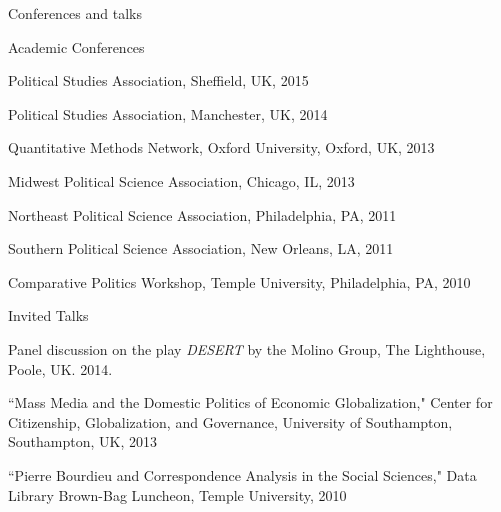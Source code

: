 \documentclass{resume} %
\begin{document}

\begin{rSection}{Conferences and talks}

\begin{rSubsection}{Academic Conferences}{}{}{}
\item Political Studies Association, Sheffield, UK, 2015
\item Political Studies Association, Manchester, UK, 2014
\item Quantitative Methods Network, Oxford University, Oxford, UK, 2013
\item Midwest Political Science Association, Chicago, IL, 2013
\item Northeast Political Science Association, Philadelphia, PA,  2011
\item Southern Political Science Association, New Orleans, LA, 2011
\item Comparative Politics Workshop, Temple University, Philadelphia, PA, 2010
\end{rSubsection}

\hangindent=1cm
\begin{rSubsection}{Invited Talks}{}{}{}
\item Panel discussion on the play \emph{DESERT} by the Molino Group, The Lighthouse, Poole, UK. 2014.
\item ``Mass Media and the Domestic Politics of Economic Globalization," Center for Citizenship, Globalization, and Governance, University of Southampton, Southampton, UK, 2013
\item ``Pierre Bourdieu and Correspondence Analysis in the Social Sciences," Data Library Brown-Bag Luncheon, Temple University, 2010       
\end{rSubsection}

\end{rSection}

\end{document}
